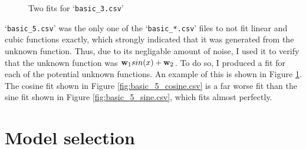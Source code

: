 \documentclass[onecolumn, 12pt, a4paper]{article}
\begin{document}
\begin{figure}[htbp]
    \centering
    \hfill
    \caption{Two fits for `\texttt{basic\_3.csv}'}
    \label{fig:basic_5.csv}
\end{figure}

`\texttt{basic\_5.csv}' was the only one of the
`\texttt{basic\_*.csv}' files to not fit linear and
cubic functions exactly, which strongly indicated that it was generated from
the unknown function. 
Thus, due to its negligable amount of noise,
I used it to verify that the unknown function was
$\vb{w}_{1}sin(x) + \vb{w}_{2}$.
To do so, I produced a fit for each of the potential
unknown functions.
An example of this is shown in Figure \ref{fig:basic_5.csv}.
The cosine fit shown in Figure \ref{fig:basic_5_cosine.csv}
is a far worse fit than the sine fit shown in Figure
\ref{fig:basic_5_sine.csv}, which fits almost perfectly.

\section{Model selection}
\end{document}
